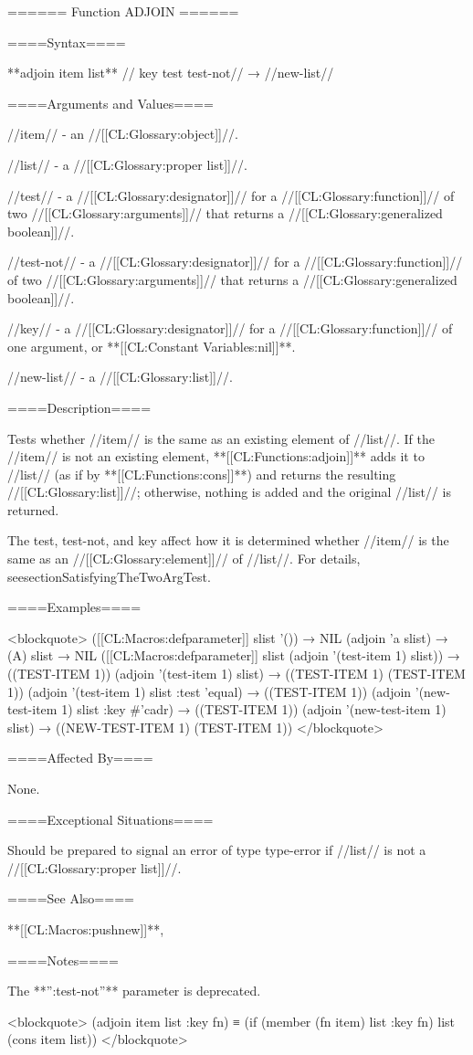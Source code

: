 ====== Function ADJOIN ======

====Syntax====

**adjoin {item list** //\key} key test test-not// → //new-list//

====Arguments and Values====

//item// - an //[[CL:Glossary:object]]//.

//list// - a //[[CL:Glossary:proper list]]//.

//test// - a //[[CL:Glossary:designator]]// for a //[[CL:Glossary:function]]// of two //[[CL:Glossary:arguments]]// that returns a //[[CL:Glossary:generalized boolean]]//.

//test-not// - a //[[CL:Glossary:designator]]// for a //[[CL:Glossary:function]]// of two //[[CL:Glossary:arguments]]// that returns a //[[CL:Glossary:generalized boolean]]//.

//key// - a //[[CL:Glossary:designator]]// for a //[[CL:Glossary:function]]// of one argument, or **[[CL:Constant Variables:nil]]**.

//new-list// - a //[[CL:Glossary:list]]//.

====Description====

Tests whether //item// is the same as an existing element of //list//. If the //item// is not an existing element, **[[CL:Functions:adjoin]]** adds it to //list// (as if by **[[CL:Functions:cons]]**) and returns the resulting //[[CL:Glossary:list]]//; otherwise, nothing is added and the original //list// is returned.

The test, test-not, and key affect how it is determined whether //item// is the same as an //[[CL:Glossary:element]]// of //list//. For details, {seesectionSatisfyingTheTwoArgTest}.

====Examples====

<blockquote> ([[CL:Macros:defparameter]] slist '()) → NIL (adjoin 'a slist) → (A) slist → NIL ([[CL:Macros:defparameter]] slist (adjoin '(test-item 1) slist)) → ((TEST-ITEM 1)) (adjoin '(test-item 1) slist) → ((TEST-ITEM 1) (TEST-ITEM 1)) (adjoin '(test-item 1) slist :test 'equal) → ((TEST-ITEM 1)) (adjoin '(new-test-item 1) slist :key #'cadr) → ((TEST-ITEM 1)) (adjoin '(new-test-item 1) slist) → ((NEW-TEST-ITEM 1) (TEST-ITEM 1)) </blockquote>

====Affected By====

None.

====Exceptional Situations====

Should be prepared to signal an error of type type-error if //list// is not a //[[CL:Glossary:proper list]]//.

====See Also====

**[[CL:Macros:pushnew]]**,

{\secref\TraversalRules}

====Notes====

The **'':test-not''** parameter is deprecated.

<blockquote> (adjoin item list :key fn) ≡ (if (member (fn item) list :key fn) list (cons item list)) </blockquote>


 
